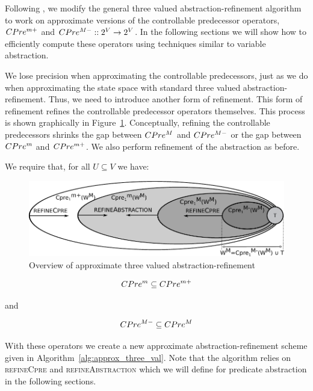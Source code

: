 Following \cite{Alfaro_Roy_07}, we modify the general three valued abstraction-refinement algorithm to work on approximate versions of the controllable predecessor operators, $CPre^{m+}$ and $CPre^{M-} :: 2^V \rightarrow 2^V$. In the following sections we will show how to efficiently compute these operators using techniques similar to variable abstraction. 

We lose precision when approximating the controllable predecessors, just as we do when approximating the state space with standard three valued abstraction-refinement. Thus, we need to introduce another form of refinement. This form of refinement refines the controllable predecessor operators themselves. This process is shown graphically in Figure~\ref{fig:approx_three_val_overview}. Conceptually, refining the controllable predecessors shrinks the gap between $CPre^M$ and $CPre^{M-}$ or the gap between $CPre^m$ and $CPre^{m+}$. We also perform refinement of the abstraction as before.

We require that, for all $U \subseteq V$ we have:

\begin{figure}
\centering
\includegraphics[width=0.85\linewidth]{imgs/approxThreeValue.pdf}
\caption{Overview of approximate three valued abstraction-refinement}
\label{fig:approx_three_val_overview}
\end{figure}


\begin{equation}
\label{eqn:cpre_p1}
CPre^m \subseteq CPre^{m+}
\end{equation}

\noindent and

\begin{equation}
\label{eqn:cpre_p2}
CPre^{M-} \subseteq CPre^M
\end{equation}

With these operators we create a new approximate abstraction-refinement scheme given in Algorithm~\ref{alg:approx_three_val}. Note that the algorithm relies on \textsc{refineCpre} and \textsc{refineAbstraction} which we will define for predicate abstraction in the following sections.

